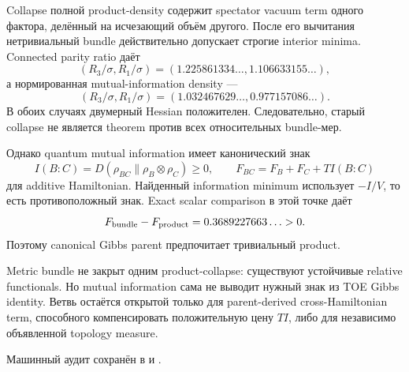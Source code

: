 Collapse полной product-density содержит spectator vacuum term одного
фактора, делённый на исчезающий объём другого. После его вычитания
нетривиальный bundle действительно допускает строгие interior minima.
Connected parity ratio даёт
\begin{equation}
 (R_3/\sigma,R_1/\sigma)
 =(1.225861334\ldots,1.106633155\ldots),
\end{equation}
а нормированная mutual-information density ---
\begin{equation}
 (R_3/\sigma,R_1/\sigma)
 =(1.032467629\ldots,0.977157086\ldots).
\end{equation}
В обоих случаях двумерный Hessian положителен. Следовательно, старый
collapse не является theorem против всех относительных bundle-мер.

Однако quantum mutual information имеет канонический знак
\begin{equation}
 I(B:C)=D(\rho_{BC}\|\rho_B\otimes\rho_C)\ge0,
 \qquad
 F_{BC}=F_B+F_C+T I(B:C)
\end{equation}
для additive Hamiltonian. Найденный information minimum использует
\(-I/V\), то есть противоположный знак. Exact scalar comparison в этой
точке даёт
\begin{equation}
 F_{\rm bundle}-F_{\rm product}
 =0.3689227663\ldots>0.
\end{equation}
Поэтому canonical Gibbs parent предпочитает тривиальный product.

\begin{theorem}
Metric bundle не закрыт одним product-collapse: существуют устойчивые
relative functionals. Но mutual information сама не выводит нужный знак из
TOE Gibbs identity. Ветвь остаётся открытой только для parent-derived
cross-Hamiltonian term, способного компенсировать положительную цену
\(T I\), либо для независимо объявленной topology measure.
\end{theorem}

Машинный аудит сохранён в
 и
.